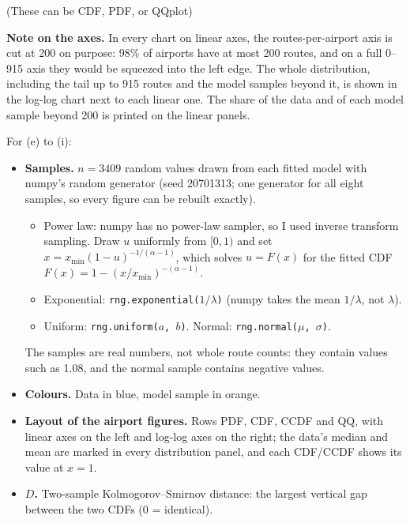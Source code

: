 \documentclass[11pt]{article}
\newcommand{\prompt}[1]{\textcolor{prompt}{#1}}
\begin{document}
\begin{enumerate}
  \clearpage
  \prompt{(These can be CDF, PDF, or QQplot)}

  \textbf{Note on the axes.} In every chart on linear axes, the routes-per-airport axis is
  cut at 200 on purpose: 98\% of airports have at most 200 routes, and on a full 0--915 axis
  they would be squeezed into the left edge. The whole distribution, including the tail up
  to 915 routes and the model samples beyond it, is shown in the log-log chart next to each
  linear one. The share of the data and of each model sample beyond 200 is printed on the
  linear panels.

  For (e) to (i):
  \begin{itemize}
    \item \textbf{Samples.} $n = 3409$ random values drawn from each fitted model with
          numpy's random generator (seed 20701313; one generator for all eight samples, so every
          figure can be rebuilt exactly).
          \begin{itemize}
            \item Power law: numpy has no power-law sampler, so I used inverse transform
                  sampling. Draw $u$ uniformly from $[0, 1)$ and set
                  $x = x_{\min}(1-u)^{-1/(\alpha-1)}$, which solves $u = F(x)$ for the fitted
                  CDF $F(x) = 1 - (x/x_{\min})^{-(\alpha-1)}$.
            \item Exponential: \texttt{rng.exponential($1/\lambda$)} (numpy takes the mean
                  $1/\lambda$, not $\lambda$).
            \item Uniform: \texttt{rng.uniform($a$, $b$)}. Normal: \texttt{rng.normal($\mu$, $\sigma$)}.
          \end{itemize}
          The samples are real numbers, not whole route counts: they contain values such as
          1.08, and the normal sample contains negative values.
    \item \textbf{Colours.} Data in blue, model sample in orange.
    \item \textbf{Layout of the airport figures.} Rows PDF, CDF, CCDF and QQ, with linear axes
          on the left and log-log axes on the right; the data's median and mean
          are marked in every distribution panel, and each CDF/CCDF shows its value at $x = 1$.
    \item \textbf{$D$.} Two-sample Kolmogorov--Smirnov distance: the largest vertical gap
          between the two CDFs (0 = identical).
  \end{itemize}


\end{enumerate}
\end{document}
